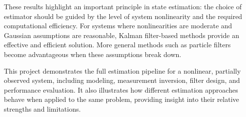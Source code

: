 \documentclass[11pt, letterpaper, twocolumn]{article}
\begin{document}
These results highlight an important principle in state estimation: the choice of estimator should be guided 
by the level of system nonlinearity and the required computational efficiency. For systems where nonlinearities 
are moderate and Gaussian assumptions are reasonable, Kalman filter-based methods provide an effective and 
efficient solution. More general methods such as particle filters become advantageous when these assumptions break down.

This project demonstrates the full estimation pipeline for a nonlinear, partially observed system, 
including modeling, measurement inversion, filter design, and performance evaluation. It also illustrates 
how different estimation approaches behave when applied to the same problem, providing insight into their 
relative strengths and limitations.
\end{document}
